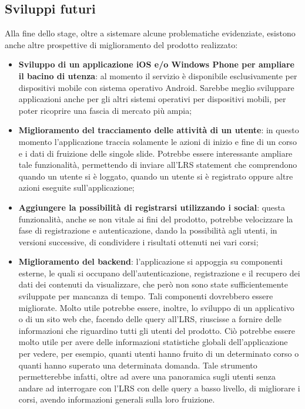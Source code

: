 \documentclass[../Tesi.tex]{subfiles}
\begin{document}
	\subsection{Sviluppi futuri}
	Alla fine dello stage, oltre a sistemare alcune problematiche evidenziate, esistono anche altre prospettive di miglioramento del prodotto realizzato:
	\begin{itemize}
		\item \textbf{Sviluppo di un applicazione iOS e/o Windows Phone per ampliare il bacino di utenza}: al momento il servizio è disponibile esclusivamente per dispositivi mobile con sistema operativo Android. Sarebbe meglio sviluppare applicazioni anche per gli altri sistemi operativi per dispositivi mobili, per poter ricoprire una fascia di mercato più ampia;
		\item \textbf{Miglioramento del tracciamento delle attività di un utente}: in questo momento l'applicazione traccia solamente le azioni di inizio e fine di un corso e i dati di fruizione delle singole slide. Potrebbe essere interessante ampliare tale funzionalità, permettendo di inviare all'LRS statement che comprendono quando un utente si è loggato, quando un utente si è registrato oppure altre azioni eseguite sull'applicazione;
		\item \textbf{Aggiungere la possibilità di registrarsi utilizzando i social}: questa funzionalità, anche se non vitale ai fini del prodotto, potrebbe velocizzare la fase di registrazione e autenticazione, dando la possibilità agli utenti, in versioni successive, di condividere i risultati ottenuti nei vari corsi;
		\item \textbf{Miglioramento del backend}: l'applicazione si appoggia su componenti esterne, le quali si occupano dell'autenticazione, registrazione e il recupero dei dati dei contenuti da visualizzare, che però non sono state sufficientemente sviluppate per mancanza di tempo. Tali componenti dovrebbero essere migliorate. Molto utile potrebbe essere, inoltre, lo sviluppo di un applicativo o di un sito web che, facendo delle query all'LRS, riuscisse a fornire delle informazioni che riguardino tutti gli utenti del prodotto. Ciò potrebbe essere molto utile per avere delle informazioni statistiche globali dell'applicazione per vedere, per esempio, quanti utenti hanno fruito di un determinato corso o quanti hanno superato una determinata domanda. Tale strumento permetterebbe infatti, oltre ad avere una panoramica sugli utenti senza andare ad interrogare con l'LRS con delle query a basso livello, di migliorare i corsi, avendo informazioni generali sulla loro fruizione.
	\end{itemize}
\end{document}
